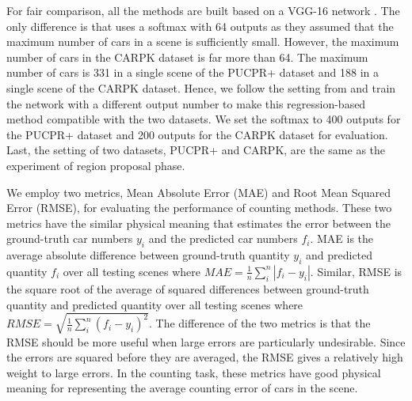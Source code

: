 \documentclass[10pt,twocolumn,letterpaper]{article}
\begin{document}
For fair comparison, all the methods are built based on a VGG-16 network \cite{06_simonyan2014very}. The only difference is that \cite{04_mundhenk2016large} uses a softmax with 64 outputs as they assumed that the maximum number of cars in a scene is sufficiently small. However, the maximum number of cars in the CARPK dataset is far more than 64. The maximum number of cars is 331 in a single scene of the PUCPR+ dataset and 188 in a single scene of the CARPK dataset. Hence, we follow the setting from \cite{04_mundhenk2016large} and train the network with a different output number to make this regression-based method compatible with the two datasets. We set the softmax to 400 outputs for the PUCPR+ dataset and 200 outputs for the CARPK dataset for evaluation. Last, the setting of two datasets, PUCPR+ and CARPK, are the same as the experiment of region proposal phase. 


We employ two metrics, Mean Absolute Error (MAE) and Root Mean Squared Error (RMSE), for evaluating the performance of counting methods. These two metrics have the similar physical meaning that estimates the error between the ground-truth car numbers $y_{i}$ and the predicted car numbers $f_{i}$. MAE is the average absolute difference between ground-truth quantity $y_{i}$ and predicted quantity $f_{i}$ over all testing scenes where $MAE = \frac{1}{n} \sum_{i}^{n} |f_{i} - y_{i}|$. Similar, RMSE is the square root of the average of squared differences between ground-truth quantity and predicted quantity over all testing scenes where $RMSE =\sqrt{\frac{1}{n} \sum_{i}^{n} (f_{i} - y_{i})^{2}}$. The difference of the two metrics is that the RMSE should be more useful when large errors are particularly undesirable. Since the errors are squared before they are averaged, the RMSE gives a relatively high weight to large errors. In the counting task, these metrics have good physical meaning for representing the average counting error of cars in the scene.
\end{document}
